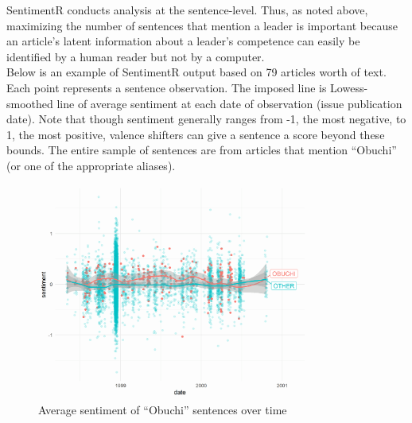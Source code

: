 \documentclass[11pt, letterpaper, twoside]{article}
\begin{document}
SentimentR conducts analysis at the sentence-level. Thus, as noted above, maximizing the number of sentences that mention a leader is important because an article's latent information about a leader's competence can easily be identified by a human reader but not by a computer.\\

Below is an example of SentimentR output based on 79 articles worth of text. Each point represents a sentence observation. The imposed line is Lowess-smoothed line of average sentiment at each date of observation (issue publication date). Note that though sentiment generally ranges from -1, the most negative, to 1, the most positive, valence shifters can give a sentence a score beyond these bounds. The entire sample of sentences are from articles that mention ``Obuchi'' (or one of the appropriate aliases). \\


\newpage
\begin{figure}
    \centering
    \includegraphics[clip, width=0.8\textwidth]{figures/obuchi_sentiment_time.png}
    \caption{Average sentiment of ``Obuchi'' sentences over time}
\end{figure}

\end{document}
